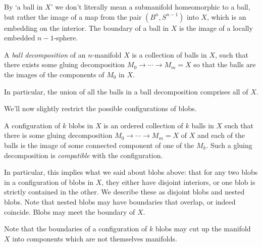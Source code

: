 By `a ball in $X$' we don't literally mean a submanifold homeomorphic to a ball, but rather the image of a map from the pair $(B^n, S^{n-1})$ into $X$, which is an embedding on the interior. The boundary of a ball in $X$ is the image of a locally embedded $n{-}1$-sphere.  

\begin{defn}
\label{defn:ball-decomposition}
A \emph{ball decomposition} of an $n$-manifold $X$ is a collection of balls in $X$, such that there exists some gluing decomposition $M_0  \to \cdots \to M_m = X$ so that the balls are the images of the components of $M_0$ in $X$. 
\end{defn}
In particular, the union of all the balls in a ball decomposition comprises all of $X$. 

We'll now slightly restrict the possible configurations of blobs.
\begin{defn}
\label{defn:configuration}
A configuration of $k$ blobs in $X$ is an ordered collection of $k$ balls in $X$ such that there is some gluing decomposition $M_0  \to \cdots \to M_m = X$ of $X$ and each of the balls is the image of some connected component of one of the $M_k$. Such a gluing decomposition is \emph{compatible} with the configuration.
\end{defn}
In particular, this implies what we said about blobs above: that for any two blobs in a configuration of blobs in $X$, they either have disjoint interiors, or one blob is strictly contained in the other. We describe these as disjoint blobs and nested blobs. Note that nested blobs may have boundaries that overlap, or indeed coincide. Blobs may meet the boundary of $X$.

Note that the boundaries of a configuration of $k$ blobs may cut up the manifold $X$ into components which are not themselves manifolds. 

